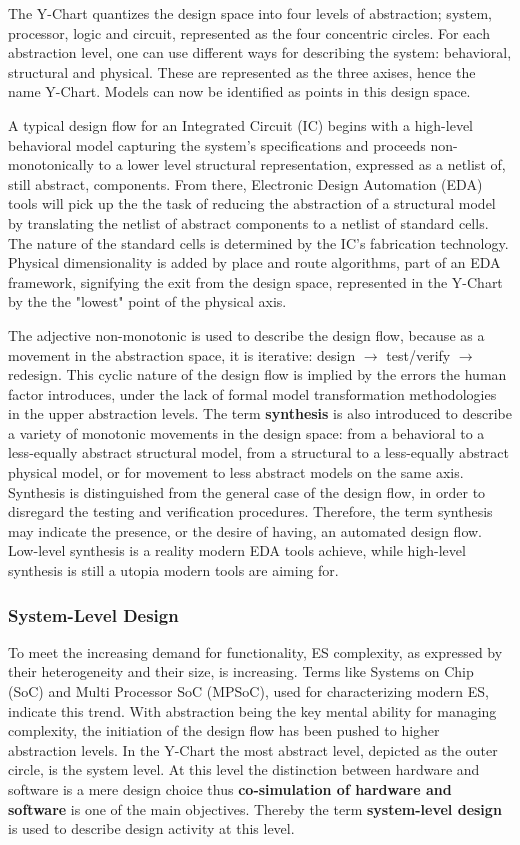\documentclass[11pt]{article}
\begin{document}
The Y-Chart quantizes the design space into four levels of abstraction; system, processor, logic and circuit, represented as the four concentric circles.
For each abstraction level, one can use different ways for describing the system: behavioral, structural and physical.
These are represented as the three axises, hence the name Y-Chart.
Models can now be identified as points in this design space.

A typical design flow for an Integrated Circuit (IC) begins with a high-level behavioral model capturing the system's specifications and proceeds non-monotonically to a lower level structural representation, expressed as a netlist of, still abstract, components.
From there, Electronic Design Automation (EDA) tools will pick up the the task of reducing the abstraction of a structural model by translating the netlist of abstract components to a netlist of standard cells.
The nature of the standard cells is determined by the IC's fabrication technology.
Physical dimensionality is added by place and route algorithms, part of an EDA framework, signifying the exit from the design space, represented in the Y-Chart by the the "lowest" point of the physical axis.

The adjective non-monotonic is used to describe the design flow, because as a movement in the abstraction space, it is iterative:
design \(\rightarrow\) test/verify \(\rightarrow\) redesign.
This cyclic nature of the design flow is implied by the errors the human factor introduces, under the lack of formal model transformation methodologies in the upper abstraction levels.
The term \textbf{synthesis} is also introduced to describe a variety of monotonic movements in the design space: from a behavioral to a less-equally abstract structural model, from a structural to a less-equally abstract physical model, or for movement to less abstract models on the same axis.
Synthesis is distinguished from the general case of the design flow, in order to disregard the testing and verification procedures.
Therefore, the term synthesis may indicate the presence, or the desire of having, an automated design flow.
Low-level synthesis is a reality modern EDA tools achieve, while high-level synthesis is still a utopia modern tools are aiming for.

\subsubsection{System-Level Design}
\label{sec:orgf0310a6}
To meet the increasing demand for functionality, ES complexity, as expressed by their heterogeneity and their size, is increasing.
Terms like Systems on Chip (SoC) and Multi Processor SoC (MPSoC), used for characterizing modern ES, indicate this trend.
With abstraction being the key mental ability for managing complexity, the initiation of the design flow has been pushed to higher abstraction levels.
In the Y-Chart the most abstract level, depicted as the outer circle, is the system level.
At this level the distinction between hardware and software is a mere design choice thus \textbf{co-simulation of hardware and software} is one of the main objectives.
Thereby the term \textbf{system-level design} is used to describe design activity at this level.
\end{document}
